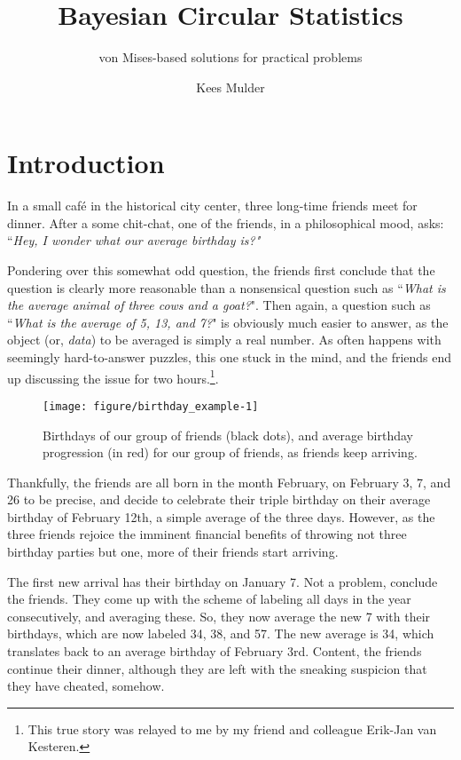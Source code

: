 \documentclass[12pt, a4paper]{book}\usepackage[]{graphicx}\usepackage[]{color}
\title{Bayesian Circular Statistics}
\subtitle{von Mises-based solutions for practical problems}
\author{Kees Mulder}
\makeatletter
\def\maxwidth{ %
  \ifdim\Gin@nat@width>\linewidth
    \linewidth
  \else
    \Gin@nat@width
  \fi
}
\newenvironment{knitrout}{}{} %
\makeatother
\begin{document}
\frontmatter

\maketitle

\tableofcontents



\mainmatter
\chapter{Introduction}
\label{intro}

In a small caf\'e in the historical city center, three long-time friends meet for dinner. After a some chit-chat, one of the friends, in a philosophical mood, asks: ``\textit{Hey, I wonder what our average birthday is?"}

Pondering over this somewhat odd question, the friends first conclude that the question is clearly more reasonable than a nonsensical question such as ``\textit{What is the average animal of three cows and a goat?}". Then again, a question such as ``\textit{What is the average of 5, 13, and 7?}" is obviously much easier to answer, as the object (or, \textit{data}) to be averaged is simply a real number. As often happens with seemingly hard-to-answer puzzles, this one stuck in the mind, and the friends end up discussing the issue for two hours.\footnote{This true story was relayed to me by my friend and colleague Erik-Jan van Kesteren.}.


\begin{figure}
\begin{knitrout}
\color{fgcolor}
\texttt{[image: figure/birthday\_example-1]} 

\end{knitrout}
\caption{Birthdays of our group of friends (black dots), and average birthday progression (in red) for our group of friends, as friends keep arriving.}
\label{birthday_example}
\end{figure}


Thankfully, the friends are all born in the month February, on February 3, 7, and 26 to be precise, and decide to celebrate their triple birthday on their average birthday of February 12th, a simple average of the three days. However, as the three friends rejoice the imminent financial benefits of throwing not three birthday parties but one, more of their friends start arriving.

The first new arrival has their birthday on January 7. Not a problem, conclude the friends. They come up with the scheme of labeling all days in the year consecutively, and averaging these. So, they now average the new 7 with their birthdays, which are now labeled 34, 38, and 57. The new average is 34, which translates back to an average birthday of February 3rd. Content, the friends continue their dinner, although they are left with the sneaking suspicion that they have cheated, somehow.
\end{document}

